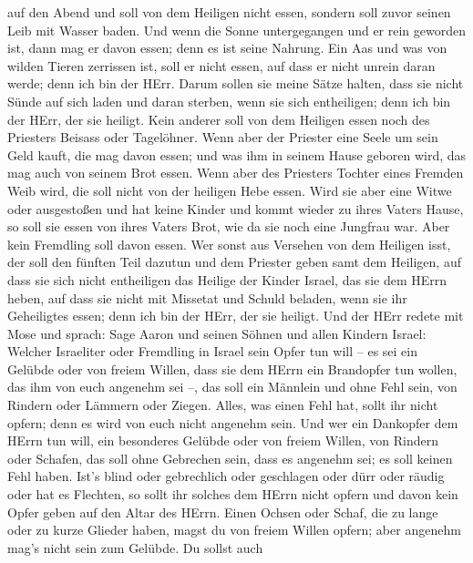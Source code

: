 auf den Abend und soll von dem Heiligen nicht essen, sondern soll zuvor
seinen Leib mit Wasser baden.  Und wenn die Sonne
untergegangen und er rein geworden ist, dann mag er davon essen; denn es
ist seine Nahrung.  Ein Aas und was von wilden Tieren
zerrissen ist, soll er nicht essen, auf dass er nicht unrein daran
werde; denn ich bin der HErr.  Darum sollen sie meine Sätze
halten, dass sie nicht Sünde auf sich laden und daran sterben, wenn sie
sich entheiligen; denn ich bin der HErr, der sie heiligt. 
Kein anderer soll von dem Heiligen essen noch des Priesters Beisass oder
Tagelöhner.  Wenn aber der Priester eine Seele um sein Geld
kauft, die mag davon essen; und was ihm in seinem Hause geboren wird,
das mag auch von seinem Brot essen.  Wenn aber des
Priesters Tochter eines Fremden Weib wird, die soll nicht von der
heiligen Hebe essen.  Wird sie aber eine Witwe oder
ausgestoßen und hat keine Kinder und kommt wieder zu ihres Vaters Hause,
so soll sie essen von ihres Vaters Brot, wie da sie noch eine Jungfrau
war. Aber kein Fremdling soll davon essen.  Wer sonst aus
Versehen von dem Heiligen isst, der soll den fünften Teil dazutun und
dem Priester geben samt dem Heiligen,  auf dass sie sich
nicht entheiligen das Heilige der Kinder Israel, das sie dem HErrn
heben,  auf dass sie nicht mit Missetat und Schuld beladen,
wenn sie ihr Geheiligtes essen; denn ich bin der HErr, der sie heiligt.
 Und der HErr redete mit Mose und sprach: 
Sage Aaron und seinen Söhnen und allen Kindern Israel: Welcher
Israeliter oder Fremdling in Israel sein Opfer tun will -- es sei ein
Gelübde oder von freiem Willen, dass sie dem HErrn ein Brandopfer tun
wollen, das ihm von euch angenehm sei --,  das soll ein
Männlein und ohne Fehl sein, von Rindern oder Lämmern oder Ziegen.
 Alles, was einen Fehl hat, sollt ihr nicht opfern; denn es
wird von euch nicht angenehm sein.  Und wer ein Dankopfer
dem HErrn tun will, ein besonderes Gelübde oder von freiem Willen, von
Rindern oder Schafen, das soll ohne Gebrechen sein, dass es angenehm
sei; es soll keinen Fehl haben.  Ist's blind oder
gebrechlich oder geschlagen oder dürr oder räudig oder hat es Flechten,
so sollt ihr solches dem HErrn nicht opfern und davon kein Opfer geben
auf den Altar des HErrn.  Einen Ochsen oder Schaf, die zu
lange oder zu kurze Glieder haben, magst du von freiem Willen opfern;
aber angenehm mag's nicht sein zum Gelübde.  Du sollst auch
